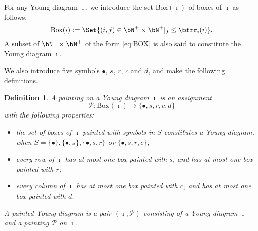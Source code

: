 \documentclass[12pt]{amsart}
\def\subset{\subseteq}
\newcommand{\CP}{{\mathcal {P}}}
\numberwithin{equation}{section}
\newtheorem{defn}[thm]{Definition}
\theoremstyle{remark}
\def\CP{\mathsf{CP}}
\begin{document}
For any Young diagram $\imath$, we introduce the set $\mathrm{Box}(\imath)$ of
boxes of $\imath$ %
as follows:
\begin{equation}\label{eq:BOX}
  \mathrm{Box}(\imath):=\Set{(i,j)\in\bN^+\times \bN^+| j\leq \bfrr_i(\imath)}.
\end{equation}
A subset of $\bN^+\times \bN^+$ of the form \eqref{eq:BOX} is also said to constitute the Young diagram $\imath$.



\renewcommand{\CP}{\mathcal{P}} We also introduce five symbols $\bullet$, $s$,
$r$, $c$ and $d$, and make the following definitions.
\begin{defn}
 A painting on a Young diagram $\imath$ is an assignment
  \[
    \mathcal P: \mathrm{Box}(\imath) \rightarrow \{\bullet, s, r, c, d \}
  \]
  with the following properties:
  \begin{itemize}
  \item the set of boxes of $\imath$ painted with symbols in $S$ constitutes a Young diagram, when
          $S=\{\bullet\}, \{\bullet, s \}, \{\bullet, s, r\}$ or
          $\{\bullet, s, r, c \} $;
    \item every row of $\imath$ has at most one box
          painted with $s$, and has at most one box painted with $r$;
    \item every column of $\imath$ has at most one
          box painted with $c$, and has at most one box painted with $d$.
  \end{itemize}
A painted Young diagram is a pair $(\imath, \CP)$ consisting of a Young diagram $\imath$ and a painting $\CP$ on $\imath$.
\end{defn}
\end{document}
